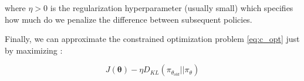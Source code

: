 \documentclass[twoside,twocolumn]{article}
\begin{document}
\noindent where $\eta > 0$ is the regularization hyperparameter (usually small) which specifies how much do we penalize the difference between subsequent policies.

Finally, we can approximate the constrained optimization problem \ref{eq:c_opt} just by maximizing \cite{Vitay}:

\begin{equation}
  J(\boldsymbol{\theta}) - \eta D_{KL}(\pi_{\theta_{old}} || \pi_{\theta})
\end{equation}



\printbibliography

\end{document}
